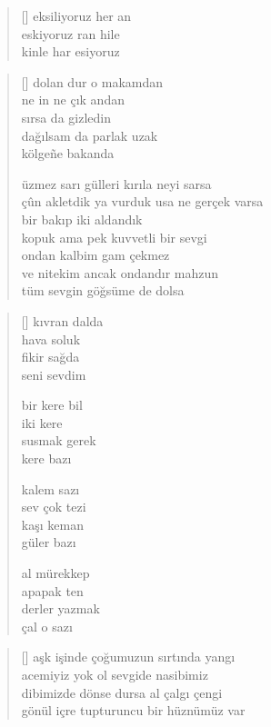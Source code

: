 \documentclass[a5paper, openright, twoside]{memoir}
\begin{document}
\begin{verse}[\versewidth]
  eksiliyoruz her an \\
  eskiyoruz ran hile \\
  kinle har esiyoruz
\end{verse}
\begin{verse}[\versewidth]
  dolan dur o makamdan \\
  ne in ne çık andan \\
  sırsa da gizledin \\
  dağılsam da parlak uzak \\
  kölge\~ne bakanda

  üzmez sarı gülleri kırıla neyi sarsa \\
  çûn akletdik ya vurduk usa ne gerçek varsa \\
  bir bakıp iki aldandık \\
  kopuk ama pek kuvvetli bir sevgi \\
  ondan kalbim gam çekmez \\
  ve nitekim ancak ondandır mahzun \\
  tüm sevgin göğsüme de dolsa \\
\end{verse}
\begin{verse}[\versewidth]
  kıvran dalda \\
  hava soluk \\
  fikir sağda \\
  seni sevdim

  bir kere bil \\
  iki kere \\
  susmak gerek \\
  kere bazı

  kalem sazı \\
  sev çok tezi \\
  kaşı keman \\
  güler bazı

  al mürekkep \\
  apapak ten \\
  derler yazmak \\
  çal o sazı \\
\end{verse}
\begin{verse}[\versewidth]
  aşk işinde çoğumuzun sırtında yangı \\
  acemiyiz yok ol sevgide nasibimiz \\
  dibimizde dönse dursa al çalgı çengi \\
  gönül içre tupturuncu bir hüznümüz var \\
\end{verse}
\end{document}
